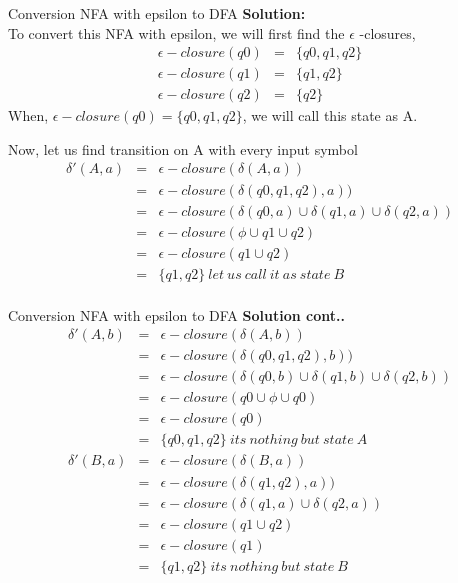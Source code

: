 \documentclass{beamer}
\begin{document}
\begin{frame}{Conversion NFA with epsilon to DFA }
	\textbf{Solution:}\\To convert this NFA with epsilon, we will first find the $\epsilon$ -closures, 
	\begin{eqnarray*}
		\epsilon -closure(q0)&=&\{q0,q1,q2\}\\
		\epsilon -closure(q1)&=&\{q1,q2\}\\
		\epsilon -closure(q2)&=&\{q2\}
	\end{eqnarray*}
When, $\epsilon-closure(q0)=\{q0,q1,q2\}$, we will call this state as A.

\par Now, let us find transition on A with every input symbol
\begin{eqnarray*}
	\delta'(A, a) &=& \epsilon-closure(\delta(A,a))\\
	&=& \epsilon-closure(\delta(q0,q1,q2), a))\\
	&=& \epsilon-closure(\delta(q0, a) \cup  \delta(q1,a) \cup  \delta(q2,a) )\\
	&=& \epsilon-closure(\phi\cup q1 \cup q2)\\
	&=& \epsilon-closure(q1\cup q2)\\
	&=& \{q1, q2\} \ let \ us\  call\  it \ as \ state\  B\\
\end{eqnarray*}
	
\end{frame}
\begin{frame}{Conversion NFA with epsilon to DFA }
	\textbf{Solution cont..}
	\begin{eqnarray*}
		\delta'(A, b) &=& \epsilon-closure(\delta(A,b))\\
		&=& \epsilon-closure(\delta(q0,q1,q2), b))\\
		&=& \epsilon-closure(\delta(q0, b) \cup  \delta(q1,b) \cup \delta(q2,b) )\\
		&=& \epsilon-closure(q0 \cup \phi \cup q0)\\
		&=& \epsilon-closure(q0)\\
		&=& \{q0,q1, q2\}\  its \ nothing\  but\  state\  A\\
		\delta'(B, a) &=& \epsilon-closure(\delta(B,a))\\
		&=& \epsilon-closure(\delta(q1,q2), a))\\
		&=& \epsilon-closure(\delta(q1,a) \cup \delta(q2,a) )\\
		&=& \epsilon-closure(q1 \cup q2)\\
		&=& \epsilon-closure(q1)\\
		&=& \{q1, q2\} \ its\  nothing\  but\  state\  B\\
	\end{eqnarray*}
\end{frame}
\end{document}
